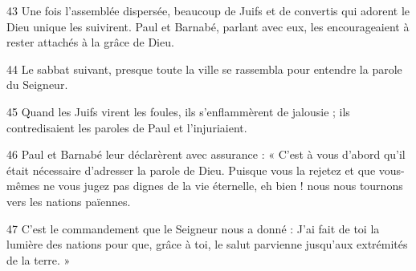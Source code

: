 43 Une fois l’assemblée dispersée, beaucoup de Juifs et de convertis qui adorent le Dieu unique les suivirent. Paul et Barnabé, parlant avec eux, les encourageaient à rester attachés à la grâce de Dieu.

44 Le sabbat suivant, presque toute la ville se rassembla pour entendre la parole du Seigneur.

45 Quand les Juifs virent les foules, ils s’enflammèrent de jalousie ; ils contredisaient les paroles de Paul et l’injuriaient.

46 Paul et Barnabé leur déclarèrent avec assurance : « C’est à vous d’abord qu’il était nécessaire d’adresser la parole de Dieu. Puisque vous la rejetez et que vous-mêmes ne vous jugez pas dignes de la vie éternelle, eh bien ! nous nous tournons vers les nations païennes.

47 C’est le commandement que le Seigneur nous a donné : J’ai fait de toi la lumière des nations pour que, grâce à toi, le salut parvienne jusqu’aux extrémités de la terre. »
